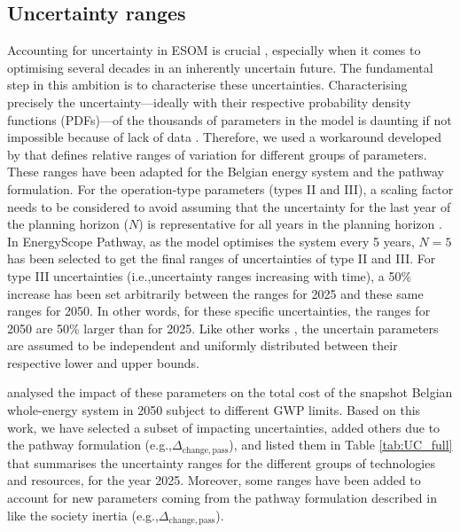 \documentclass[11pt,twoside,a4paper,english]{article}
\def\eg{e.g.,}
\def\ie{i.e.,}
\begin{document}
\begin{appendices}
\subsection{Uncertainty ranges}
\label{subsec:cs:uncertainty}
Accounting for uncertainty in \gls{ESOM} is crucial \cite{mavromatidis2018uncertainty}, especially when it comes to optimising several decades in an inherently uncertain future. The fundamental step in this ambition is to characterise these uncertainties.  Characterising precisely the uncertainty---ideally with their respective probability density functions (PDFs)---of the thousands of parameters in the model is daunting if not impossible because of lack of data \cite{marnay2006addressing}. Therefore, we used a workaround developed by \citet{Moret2017} that defines relative ranges of variation for different groups of parameters. These ranges have been adapted for the Belgian energy system and the pathway formulation.  For the operation-type parameters (types II and III), a scaling factor needs to be considered to avoid assuming that the uncertainty for the last year of the planning horizon ($N$) is representative for all years in the planning horizon \citet{Moret2017}. In EnergyScope Pathway, as the model optimises the system every 5 years, $N=5$ has been selected to get the final ranges of uncertainties of type II and III. For type III uncertainties (\ie uncertainty ranges increasing with time), a 50\% increase has been set arbitrarily between the ranges for 2025 and these same ranges for 2050. In other words, for these specific uncertainties, the ranges for 2050 are 50\% larger than for 2025. Like other works \cite{li2019renewables,coppitters2021robust}, the uncertain parameters are assumed to be independent and uniformly distributed between their respective lower and upper bounds. 

\citet{rixhon2021role} analysed the impact of these parameters on the total cost of the snapshot Belgian whole-energy system in 2050 subject to different \gls{GWP} limits. Based on this work, we have selected a subset of impacting uncertainties, added others due to the pathway formulation (\eg $\Delta_{\mathrm{change,pass}}$), and listed them in Table \ref{tab:UC_full} that summarises the uncertainty ranges for the different groups of technologies and resources, for the year 2025.  Moreover, some ranges have been added to account for new parameters coming from the pathway formulation described in {\color{red} } like the society inertia (\eg $\Delta_{\mathrm{change,pass}}$). 


\end{appendices}
\end{document}

